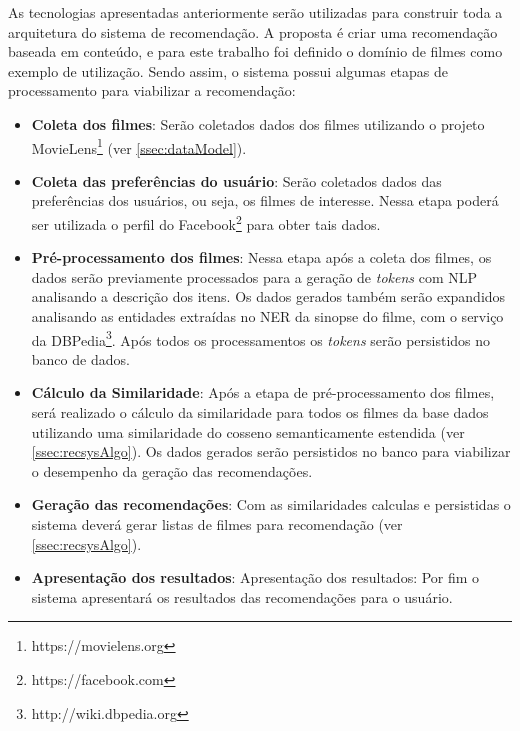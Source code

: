 As tecnologias apresentadas anteriormente serão utilizadas para construir toda a arquitetura do sistema de recomendação. A proposta é criar uma recomendação baseada em conteúdo, e para este trabalho foi definido o domínio de filmes como exemplo de utilização. Sendo assim, o sistema possui algumas etapas de processamento para viabilizar a recomendação:

\begin{itemize}
	\item{\textbf{Coleta dos filmes}: Serão coletados dados dos filmes utilizando o projeto MovieLens\footnote{https://movielens.org} (ver \ref{ssec:dataModel}).}
	
	\item{\textbf{Coleta das preferências do usuário}: Serão coletados dados das preferências dos usuários, ou seja, os filmes de interesse. Nessa etapa poderá ser utilizada o perfil do Facebook\footnote{https://facebook.com} para obter tais dados.}
	
	\item{\textbf{Pré-processamento dos filmes}: Nessa etapa após a coleta dos filmes, os dados serão previamente processados para a geração de \textit{tokens} com \ac{NLP} analisando a descrição dos itens. Os dados gerados também serão expandidos analisando as entidades extraídas no \ac{NER} da sinopse do filme, com o serviço da DBPedia\footnote{http://wiki.dbpedia.org}. Após todos os processamentos os \textit{tokens} serão persistidos no banco de dados.}

	\item{\textbf{Cálculo da Similaridade}: Após a etapa de pré-processamento dos filmes, será realizado o cálculo da similaridade para todos os filmes da base dados utilizando uma similaridade do cosseno semanticamente estendida (ver \ref{ssec:recsysAlgo}). Os dados gerados serão persistidos no banco para viabilizar o desempenho da geração das recomendações.}
	
	\item{\textbf{Geração das recomendações}: Com as similaridades calculas e persistidas o sistema deverá gerar listas de filmes para recomendação (ver \ref{ssec:recsysAlgo}).}
	
	\item{\textbf{Apresentação dos resultados}: Apresentação dos resultados: Por fim o sistema apresentará os resultados das recomendações para o usuário.}		
\end{itemize}

